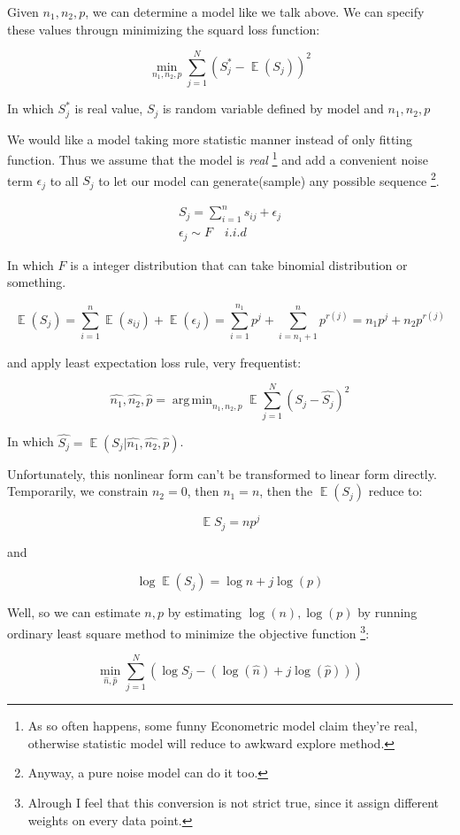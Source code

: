 \documentclass{article}
\DeclareMathOperator*{\argmin}{arg\,min}
\DeclareMathOperator{\E}{\mathbb{E}}
\begin{document}
Given $n_1,n_2,p$, we can determine a model like we talk above. 
We can specify these values througn minimizing the squard loss function:

\[
\min_{n_1,n_2,p} \sum_{j=1}^N (S^*_j - \E(S_j))^2
\]

In which $S^*_j$ is real value, $S_j$ is random variable defined by model and $n_1,n_2,p$

We would like a model taking more statistic manner instead of only fitting function. 
Thus we assume that the model is \textit{real} 
\footnote{As so often happens, some funny Econometric model claim they're real, 
otherwise statistic model will reduce to awkward explore method.} 
and add a convenient noise term  $\epsilon_j$  to all $S_j$ to let our model can generate(sample) 
any possible sequence \footnote{Anyway, a pure noise model can do it too.}.

\begin{align*}
S_j = \sum_{i=1}^n s_{ij} + \epsilon_j \\
\epsilon_j \sim F \quad i.i.d 
\end{align*}

In which $F$ is a integer distribution that can take binomial distribution or something.

\[
\E(S_j) = \sum_{i=1}^n \E(s_{ij}) + \E(\epsilon_j) = \sum_{i=1}^{n_1} p^j + \sum_{i=n_1+1}^n p^{r(j)}
= n_1 p^j + n_2 p^{r(j)}
\]

and apply least expectation loss rule, very frequentist:

\[
\hat{n_1},\hat{n_2},\hat{p} = \argmin_{n_1,n_2,p} \E\sum_{j=1}^N (S_j - \hat{S_j})^2
\]

In which $\hat{S_j} = \E(S_j | \hat{n_1},\hat{n_2},\hat{p})$.

Unfortunately, this nonlinear form can't be transformed to linear form directly. Temporarily, 
we constrain $n_2 = 0$, then $n_1 = n$, then the $\E(S_j)$ reduce to:

\[
\E{S_j} = n p^j
\]

and

\[
\log \E(S_j) = \log n + j \log(p)
\]

Well, so we can estimate $n,p$ by estimating $\log(n),\log(p)$ by running ordinary least square method to 
minimize the objective function \footnote{Alrough I feel that this conversion is not strict true, since
it assign different weights on every data point.}: 

\[
\min_{\hat{n},\hat{p}} \sum_{j=1}^N ( \log{S_j} - (\log(\hat{n}) + j \log(\hat{p})) )
\]
\end{document}
